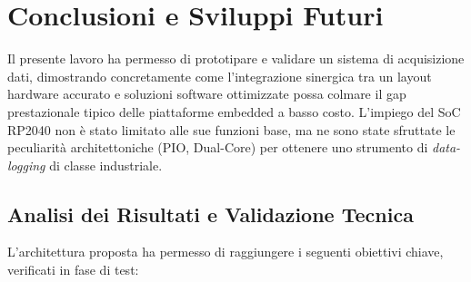 \newpage
\section{Conclusioni e Sviluppi Futuri}

Il presente lavoro ha permesso di prototipare e validare un sistema di acquisizione dati, dimostrando concretamente come l'integrazione sinergica tra un layout hardware accurato e soluzioni software ottimizzate possa colmare il gap prestazionale tipico delle piattaforme embedded a basso costo. L'impiego del SoC RP2040 non è stato limitato alle sue funzioni base, ma ne sono state sfruttate le peculiarità architettoniche (PIO, Dual-Core) per ottenere uno strumento di \textit{data-logging} di classe industriale.

\subsection{Analisi dei Risultati e Validazione Tecnica}

L'architettura proposta ha permesso di raggiungere i seguenti obiettivi chiave, verificati in fase di test:

